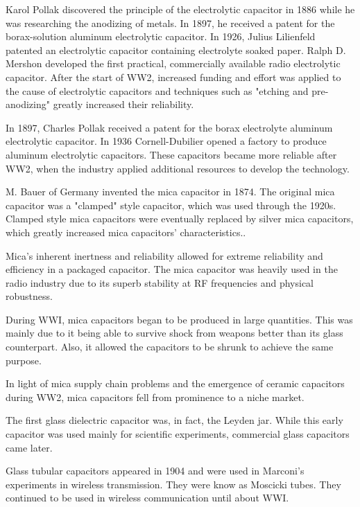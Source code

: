 Karol Pollak discovered the principle of the electrolytic capacitor in 1886 while he was researching the anodizing of metals. In 1897, he received a patent for the borax-solution aluminum electrolytic capacitor. In 1926, Julius Lilienfeld patented an electrolytic capacitor containing electrolyte soaked paper. Ralph D. Mershon developed the first practical, commercially available radio electrolytic capacitor. After the start of WW2, increased funding and effort was applied to the cause of electrolytic capacitors and techniques such as "etching and pre-anodizing" greatly increased their reliability. \cite{wiki_elec}

In 1897, Charles Pollak received a patent for the borax electrolyte aluminum electrolytic capacitor. In 1936 Cornell-Dubilier opened a factory to produce aluminum electrolytic capacitors. These capacitors became more reliable after WW2, when the industry applied additional resources to develop the technology.\cite{deis_hist}

\nocite{hh}
\nocite{capGuide_mica}
\noindent M. Bauer of Germany invented the mica capacitor in 1874. The original mica capacitor was a "clamped" style capacitor, which was used through the 1920s.\cite{wiki_mica} Clamped style mica capacitors were eventually replaced by silver mica capacitors, which greatly increased mica capacitors' characteristics.\cite{learn_caps}.

\noindent Mica's inherent inertness and reliability allowed for extreme reliability and efficiency in a packaged capacitor.\cite{tedds_mica} The mica capacitor was heavily used in the radio industry due to its superb stability at RF frequencies and physical robustness.\cite{radio_mica}

\noindent During WWI, mica capacitors began to be produced in large quantities. This was mainly due to it being able to survive shock from weapons better than its glass counterpart. Also, it allowed the capacitors to be shrunk to achieve the same purpose. \cite[f.~37-41]{dumInv}

\noindent In light of mica supply chain problems and the emergence of ceramic capacitors during WW2, mica capacitors fell from prominence to a niche market.\cite[Ch 3, Sec II]{cerMaterials}

\noindent The first glass dielectric capacitor was, in fact, the Leyden jar. While this early capacitor was used mainly for scientific experiments, commercial glass capacitors came later. 

\noindent Glass tubular capacitors appeared in 1904 and were used in Marconi's experiments in wireless transmission. They were know as Moscicki tubes. They continued to be used in wireless communication until about WWI. \cite[p.~102]{dumInv}

